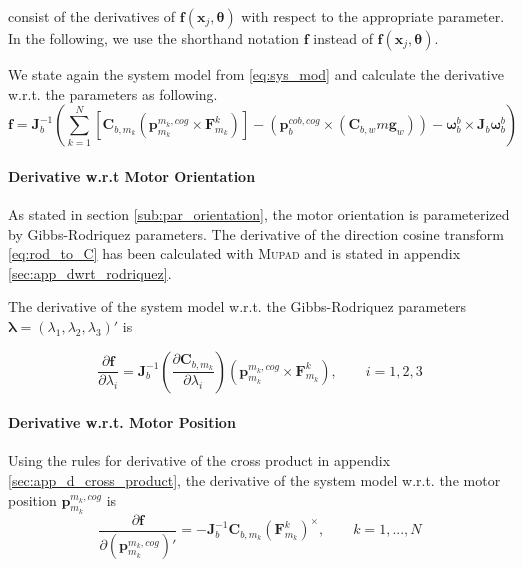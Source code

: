 consist of the derivatives of $\mathbf{f}(\mathbf{x}_j, \boldsymbol{\theta})$
with respect to the appropriate parameter.
In the following, we use the shorthand notation $\mathbf{f}$
instead of $\mathbf{f}(\mathbf{x}_j, \boldsymbol{\theta})$.

We state again the system model from \eqref{eq:sys_mod} and calculate the derivative w.r.t. the parameters as following.
\begin{equation*}
\mathbf{f}
= \mathbf{J}_b^{-1} \left( 
\sum_{k=1}^N  \left[  \mathbf{C}_{b,m_k} \left( \mathbf{p}^{m_k,cog}_{m_k} \times \mathbf{F}^k_{m_k} \right)  \right]
-
\left( \mathbf{p}^{cob,cog}_b \times (\mathbf{C}_{b,w}m\mathbf{g}_w) \right)
- \boldsymbol{\omega}_b^b \times \mathbf{J}_b \boldsymbol{\omega}_b^b \right)
\end{equation*}


\paragraph{Derivative w.r.t Motor Orientation\\}
As stated in section \ref{sub:par_orientation}, the motor orientation is parameterized by Gibbs-Rodriquez parameters. The derivative of the direction cosine transform \eqref{eq:rod_to_C} has been calculated with \textsc{Mupad} and is stated in appendix \ref{sec:app_dwrt_rodriquez}.

The derivative of the system model w.r.t. the Gibbs-Rodriquez parameters $\boldsymbol{\lambda} = (\lambda_1, \lambda_2, \lambda_3)'$ is

\begin{equation}
\frac{\partial \mathbf{f}}{\partial \lambda_i} =
\mathbf{J}_b^{-1} 
\left( \frac{\partial \mathbf{C}_{b,m_k}}{\partial \lambda_i} \right)
\left( \mathbf{p}^{m_k,cog}_{m_k} \times \mathbf{F}^k_{m_k} \right)
, \qquad i = 1,2,3
\end{equation}

\paragraph{Derivative w.r.t. Motor Position\\}
Using the rules for derivative of the cross product in appendix \ref{sec:app_d_cross_product}, the derivative of the system model w.r.t. the motor position $\mathbf{p}^{m_k,cog}_{m_k}$ is
\begin{equation}
\frac{\partial \mathbf{f}}{\partial (\mathbf{p}^{m_k,cog}_{m_k})'} =
- \mathbf{J}_b^{-1} 
\mathbf{C}_{b,m_k}
\left( \mathbf{F}^k_{m_k} \right) ^\times
, \qquad k = 1,...,N
\end{equation}

